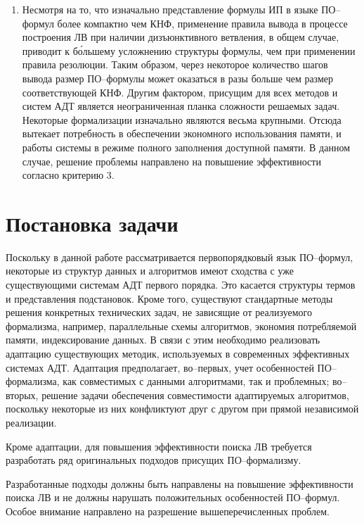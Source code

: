 \begin{enumerate}
\item Несмотря на то, что изначально представление формулы ИП в языке ПО--формул более компактно чем КНФ, применение правила вывода в процессе построения ЛВ при наличии дизъюнктивного ветвления, в общем случае, приводит к б\'{о}льшему усложнению структуры формулы, чем при применении правила резолюции. Таким образом, через некоторое количество шагов вывода размер ПО--формулы может оказаться в разы больше чем размер соответствующей КНФ. Другим фактором, присущим для всех методов и систем АДТ является неограниченная планка сложности решаемых задач. Некоторые формализации изначально являются весьма крупными. Отсюда вытекает потребность в обеспечении экономного использования памяти, и работы системы в режиме полного заполнения доступной памяти. В данном случае, решение проблемы направлено на повышение эффективности согласно критерию 3.
\end{enumerate}


\section{Постановка задачи}
Поскольку в данной работе рассматривается первопорядковый язык ПО--формул, некоторые из структур данных и алгоритмов имеют сходства с уже существующими системам АДТ первого порядка. Это касается структуры термов и представления подстановок. Кроме того, существуют стандартные методы решения конкретных технических задач, не зависящие от реализуемого формализма, например, параллельные схемы алгоритмов, экономия потребляемой памяти, индексирование данных. В связи с этим необходимо реализовать адаптацию существующих методик, используемых в современных эффективных системах АДТ. Адаптация предполагает, во--первых, учет особенностей ПО--формализма, как совместимых с данными алгоритмами, так и проблемных; во--вторых, решение задачи обеспечения совместимости адаптируемых алгоритмов, поскольку некоторые из них конфликтуют друг с другом при прямой независимой реализации.

Кроме адаптации, для повышения эффективности поиска ЛВ требуется разработать ряд оригинальных подходов присущих ПО--формализму.

Разработанные подходы должны быть направлены на повышение эффективности поиска ЛВ и не должны нарушать положительных особенностей ПО--формул. Особое внимание направлено на разрешение вышеперечисленных проблем.



